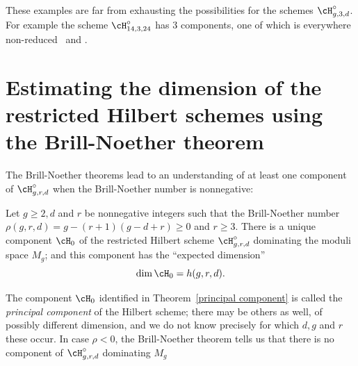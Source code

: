 These examples are far from exhausting the possibilities for the schemes $\cH^{\circ}_{g,3,d}$. For example
the scheme $\cH^{\circ}_{14,3,24}$ has 3 components, one of which is everywhere non-reduced~\cite{Mumford1962} and
\cite{Nasu2008}.


\section{Estimating the dimension of the restricted Hilbert schemes using the Brill-Noether theorem}\label{estimating dim hilb}

The Brill-Noether theorems lead to an understanding of at least one component of $\cH^{\circ}_{g,r,d}$ when
the Brill-Noether number is nonnegative:

\begin{theorem}\label{principal component}
Let $g\geq 2, d$ and $r$ be nonnegative integers such that the Brill-Noether number  $\rho(g,r,d) = g - (r+1)(g-d+r) \geq 0$
and $r\geq 3$.  There is a unique component $\cH_0$ of the restricted Hilbert scheme $\cH^\circ_{g,r,d}$ dominating the moduli space $M_g$; and this component has the ``expected dimension''
$$
\dim \cH_0 = h(g,r,d).
$$
\end{theorem}

 The component $\cH_0$ identified in Theorem~\ref{principal component} is called the \emph{principal component} of the Hilbert scheme; there may be others as well, of possibly different dimension, and we do not know precisely for which $d,g$ and $r$ these occur. In case $\rho < 0$, the Brill-Noether theorem tells us that there is no component of $\cH^\circ_{g,r,d}$ dominating $M_g$


